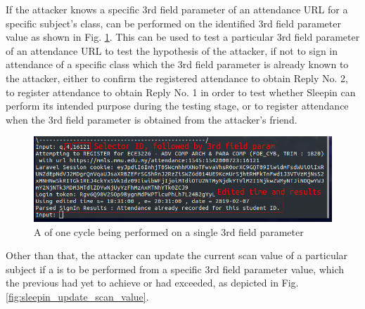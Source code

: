 \documentclass[runningheads]{llncs}
\begin{document}
If the attacker knows a specific 3rd field parameter of an attendance URL for a specific subject's class, \scanattack{} can be performed on the identified 3rd field parameter value as shown in Fig. \ref{fig:sleepin_single_instance}. This can be used to test a particular 3rd field parameter of an attendance URL to test the hypothesis of the attacker, if not to sign in attendance of a specific class which the 3rd field parameter is already known to the attacker, either to confirm the registered attendance to obtain Reply No. 2, to register attendance to obtain Reply No. 1 in order to test whether Sleepin can perform its intended purpose during the testing stage, or to register attendance when the 3rd field parameter is obtained from the attacker's friend. 

\begin{figure}
\includegraphics[width=\textwidth]{imgres/sleepin_single_instance.png}
\caption{A \scanattack{} of one cycle being performed on a single 3rd field parameter} 
\label{fig:sleepin_single_instance}
\end{figure}

Other than that, the attacker can update the current scan value of a particular subject if a \scanattack{} is to be performed from a specific 3rd field parameter value, which the previous \scanattack{} had yet to achieve or had exceeded, as depicted in Fig. \ref{fig:sleepin_update_scan_value}. 
\end{document}

